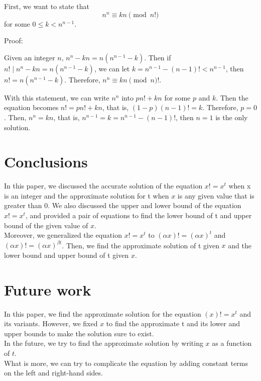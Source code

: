 \documentclass{article}
\begin{document}
        First, we want to state that $$n^n\equiv kn \pmod {n!}$$ for some $0\leq k<n^{n-1}$.
        
        Proof: 
        
        Given an integer $n$, $n^n-kn = n(n^{n-1}-k)$. Then if $n!\mid n^n-kn=n(n^{n-1}-k)$, we can let $k=n^{n-1}-(n-1)!<n^{n-1}$, then $n!=n(n^{n-1}-k)$. Therefore, $n^n\equiv kn \pmod n!$.

        With this statement, we can write $n^n$ into $pn!+kn$ for some $p$ and $k$. Then the equation becomes $n!=pn!+kn$, that is, $(1-p)(n-1)!=k$. Therefore, $p=0$. Then, $n^n=kn$, that is, $n^{n-1}=k=n^{n-1}-(n-1)!$, then $n=1$ is the only solution.
        
        
        
        \section{Conclusions}
        In this paper, we discussed the accurate solution of the equation $x! = x ^ {t}$ when x is an integer and the approximate solution for t when $x$ is any given value that is greater than 0. We also discussed the upper and lower bound of the equation $x! = x ^ {t}$, and provided a pair of equations to find the lower bound of t and upper bound of the given value of $x$. \\

        Moreover, we generalized the equation $x! = x ^ {t}$ to $(\alpha x)! = (\alpha x) ^ t$ and $(\alpha x)! = (\alpha x) ^ {\beta t}$. Then, we find the approximate solution of t given $x$ and the lower bound and upper bound of t given $x$.\\
        
        \section{Future work}
        In this paper, we find the approximate solution for the equation ${( x)}! = x ^ {t}$ and its variants. However, we fixed $x$ to find the approximate t and its lower and upper bounds to make the solution sure to exist.\\

        In the future, we try to find the approximate solution by writing $x$ as a function of $t$.\\

        What is more, we can try to complicate the equation by adding constant terms on the left and right-hand sides. \\
\end{document}
